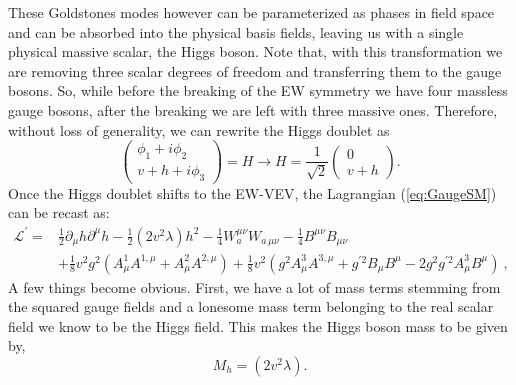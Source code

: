 These Goldstones modes however can be parameterized as phases in field space and can be absorbed into the physical basis fields, leaving us with a single physical massive scalar, the Higgs boson. 
%
Note that, with this transformation we are removing three scalar degrees of freedom and transferring them to the gauge bosons.  %
%
%
So, while before the breaking of the EW symmetry we have four massless gauge bosons, after the breaking we are left with three massive ones.
%
%
%
Therefore, without loss of generality, we can rewrite the Higgs doublet as
%
\begin{equation}
 \begin{pmatrix}
\phi_1 + i \phi_2 \\ 
v + h + i \phi_3 
\end{pmatrix} = H  \rightarrow H =  \frac{1}{\sqrt{2}} \begin{pmatrix}
0 \\ 
v + h 
\end{pmatrix}  .
\label{shame}
\end{equation}
Once the Higgs doublet shifts to the EW-VEV, the Lagrangian (\ref{eq:GaugeSM}) can be recast as:
%
\begin{align}
\mathcal{L}^\prime = & \frac{1}{2} \partial_\mu h \partial^\mu h - \frac{1}{2} (2v^2 \lambda) h^2
 - \frac{1}{4}  W^{\mu \nu}_a W_{a \, \mu \nu}  
- \frac{1}{4}  B^{\mu \nu} B_{\mu \nu}  \nonumber \\
& + \frac{1}{8} v^2 g^2 (A^1_\mu A^{1,\mu}+ A^2_\mu A^{2,\mu}) +  \frac{1}{8} v^2  (g^2  A^3_\mu A^{3,\mu} + g^{\prime 2} B_\mu B^\mu - 2 g^2 g^{\prime 2} A^3_\mu B^\mu )  \ , 
\label{complicatedpart}
\end{align}
%
A few things become obvious. First, we have a lot of mass terms stemming from the squared gauge fields and a lonesome mass term belonging to the real scalar field we know to be the Higgs field. This makes the Higgs boson mass to be given by,
%
\begin{equation}
M_h= (2v^2 \lambda).  
\end{equation}
